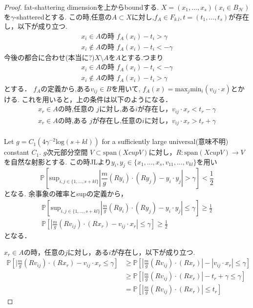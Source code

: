 \documentclass{ujarticle}
\begin{document}
\begin{proof}
  fat-shattering dimensionを上からboundする.
  $X=(x_1,\dots,x_s)(x_i \in B_{\mathcal{H}})$を$\gamma$-shatteredとする.
  この時,任意の$A \subset X$に対し,$f_A \in F_{k.l},t=(t_1,\dots,t_s)$が存在し，以下が成り立つ.
  \begin{eqnarray*}
 x_i \in A \mbox{の時 } f_A(x_i) - t_i > \gamma   \\
x_i \notin A \mbox{の時 } f_A(x_i) -t_i < - \gamma
  \end{eqnarray*}
  今後の都合に合わせ(本当に?)$X \setminus A$を$A$とする.つまり
  \begin{eqnarray*}
 x_i \in A \mbox{の時 } f_A(x_i) - t_i < - \gamma   \\
x_i \notin A \mbox{の時 } f_A(x_i) -t_i > \gamma
  \end{eqnarray*}
とする．
  $f_A$の定義から,ある$v_{ij} \in B$を用いて,
  $f_A(x)=\mathrm{max}_j \mathrm{min}_i(v_{ij} \cdot x) $とかける.
これを用いると，上の条件は以下のようになる．
\begin{eqnarray*}
x_r \in A \mbox{の時,任意の }j\mbox{に対し,ある}i{が存在し，} v_{ij} \cdot x_r  < t_r - \gamma   \\
x_r \in A \mbox{の時,ある }j\mbox{が存在し,任意の}i{に対し，} v_{ij} \cdot x_r  > t_r + \gamma   \\
\end{eqnarray*}

  Let $g= C_1(4\gamma^{-2} \mathrm{log}(s + kl))$
  for a sufficiently large universal(意味不明) constant $C_1$.
$g$次元部分空間 $V \subset \mathrm{span}(X cup V) $に対し，$ R : \mathrm{span}(X cup V) \to V$を自然な射影とする.
  この時JLより$y_i,y_j \in \{ x_1 ,\dots ,x_s,v_11 ,\dots ,v_{kl} \}$を用い
  \begin{equation*}
   \mathbb{P} [\mathrm{sup}_{i,j \in \{ 1,\dots, s+kl\} } | \frac{m}{g}(Ry_i)\cdot (Ry_j) - y_i \cdot  y_j| > \gamma ] < \frac{1}{2}
 \end{equation*}
となる.
余事象の確率とsupの定義から，
\begin{eqnarray*}
  \mathbb{P} [\mathrm{sup}_{i,j \in \{ 1,\dots, s+kl\} } | \frac{m}{g}(Ry_i)\cdot (Ry_j) - y_i \cdot  y_j |\le  \gamma ] \ge \frac{1}{2} \\
    \mathbb{P} [ | \frac{m}{g}(Rv_{ij})\cdot (Rx_r) - v_{ij} \cdot  x_r | \le  \gamma ] \ge \frac{1}{2}
\end{eqnarray*}
となる．

$x_r \in A$の時，任意の$j$に対し，ある$i$が存在し，以下が成り立つ.
\begin{eqnarray*}
  \mathbb{P} [ | \frac{m}{g}(Rv_{ij})\cdot (Rx_r) - v_{ij} \cdot  x_r \le  \gamma ]
  & \ge   \mathbb{P} [ | \frac{m}{g}(Rv_{ij})\cdot (Rx_r)| - |v_{ij} \cdot  x_r| \le  \gamma ] \\
  & \ge \mathbb{P} [ | \frac{m}{g}(Rv_{ij})\cdot (Rx_r)| - t_r + \gamma  \le  \gamma ] \\
  & = \mathbb{P} [ | \frac{m}{g}(Rv_{ij})\cdot (Rx_r)| \le t_r  ]
\end{eqnarray*}


\end{proof}
\end{document}
